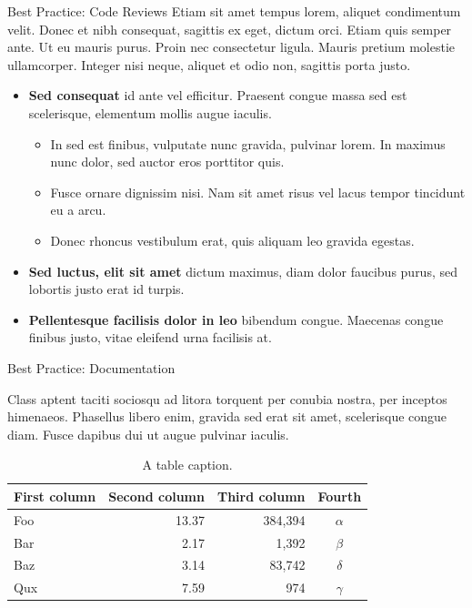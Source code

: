 \documentclass[final]{beamer}
\newlength{\colwidth}
\begin{document}
\begin{frame}[t]
\begin{columns}[t]
\begin{column}{\colwidth}
\begin{block}{Best Practice: Code Reviews}
    Etiam sit amet tempus lorem, aliquet condimentum velit. Donec et nibh
    consequat, sagittis ex eget, dictum orci. Etiam quis semper ante. Ut eu
    mauris purus. Proin nec consectetur ligula. Mauris pretium molestie
    ullamcorper. Integer nisi neque, aliquet et odio non, sagittis porta justo.

    \begin{itemize}
      \item \textbf{Sed consequat} id ante vel efficitur. Praesent congue massa
        sed est scelerisque, elementum mollis augue iaculis.
        \begin{itemize}
          \item In sed est finibus, vulputate
            nunc gravida, pulvinar lorem. In maximus nunc dolor, sed auctor eros
            porttitor quis.
          \item Fusce ornare dignissim nisi. Nam sit amet risus vel lacus
            tempor tincidunt eu a arcu.
          \item Donec rhoncus vestibulum erat, quis aliquam leo
            gravida egestas.
        \end{itemize}
      \item \textbf{Sed luctus, elit sit amet} dictum maximus, diam dolor
        faucibus purus, sed lobortis justo erat id turpis.
      \item \textbf{Pellentesque facilisis dolor in leo} bibendum congue.
        Maecenas congue finibus justo, vitae eleifend urna facilisis at.
    \end{itemize}

  \end{block}

  \begin{block}{Best Practice: Documentation}

    Class aptent taciti sociosqu ad litora torquent per conubia nostra, per
    inceptos himenaeos. Phasellus libero enim, gravida sed erat sit amet,
    scelerisque congue diam. Fusce dapibus dui ut augue pulvinar iaculis.

    \begin{table}
      \centering
      \begin{tabular}{l r r c}
        \toprule
        \textbf{First column} & \textbf{Second column} & \textbf{Third column} & \textbf{Fourth} \\
        \midrule
        Foo & 13.37 & 384,394 & $\alpha$ \\
        Bar & 2.17 & 1,392 & $\beta$ \\
        Baz & 3.14 & 83,742 & $\delta$ \\
        Qux & 7.59 & 974 & $\gamma$ \\
        \bottomrule
      \end{tabular}
      \caption{A table caption.}
    \end{table}


\end{block}
\end{column}
\end{columns}
\end{frame}
\end{document}
